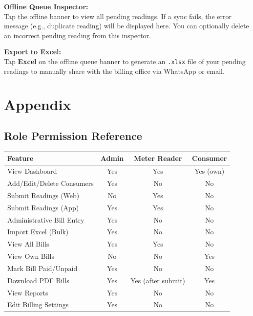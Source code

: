 \documentclass[12pt, a4paper]{report}
\begin{document}
\textbf{Offline Queue Inspector:}\\
Tap the offline banner to view all pending readings. If a sync fails, the error message (e.g., duplicate reading) will be displayed here. You can optionally delete an incorrect pending reading from this inspector.

\textbf{Export to Excel:}\\
Tap \textbf{Excel} on the offline queue banner to generate an \texttt{.xlsx} file of your pending readings to manually share with the billing office via WhatsApp or email.

\chapter{Appendix}

\section{Role Permission Reference}

\begin{table}[H]
\centering
\begin{tabularx}{\textwidth}{X c c c}
\toprule
\textbf{Feature} & \textbf{Admin} & \textbf{Meter Reader} & \textbf{Consumer} \\
\midrule
View Dashboard & Yes & Yes & Yes (own) \\
Add/Edit/Delete Consumers & Yes & No & No \\
Submit Readings (Web) & No & Yes & No \\
Submit Readings (App) & Yes & Yes & No \\
Administrative Bill Entry & Yes & No & No \\
Import Excel (Bulk) & Yes & No & No \\
View All Bills & Yes & Yes & No \\
View Own Bills & No & No & Yes \\
Mark Bill Paid/Unpaid & Yes & No & No \\
Download PDF Bills & Yes & Yes (after submit) & Yes \\
View Reports & Yes & No & No \\
Edit Billing Settings & Yes & No & No \\
\bottomrule
\end{tabularx}
\end{table}
\end{document}
